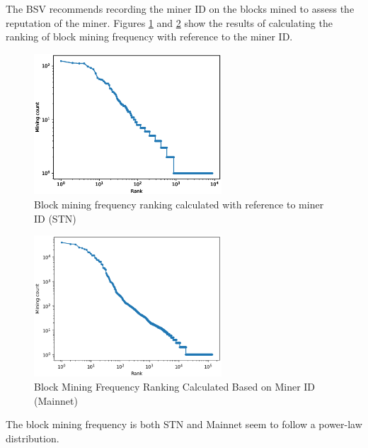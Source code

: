 \documentclass[graybox]{svmult}
\begin{document}
The BSV recommends recording the miner ID on the blocks mined to assess the reputation of the miner.
Figures \ref{fig:minerrank_stn} and \ref{fig:minerrank_mainnet} show the results of calculating the ranking of block mining frequency with reference to the miner ID.
%
\begin{figure}[t]
  \vspace{-35mm}
  \begin{center}
    \includegraphics[width=70mm]{bsv_stn-block_miners-ranking-loglog.eps}
  \end{center}
  \vspace{35mm}
  \caption{Block mining frequency ranking calculated with reference to miner ID (STN)}
  \label{fig:minerrank_stn}
\end{figure}
%
%
\begin{figure}[t]
  \begin{center}
    \includegraphics[width=70mm]{bsv_mainnet-block_miners-ranking-loglog.eps}
  \end{center}
  \caption{Block Mining Frequency Ranking Calculated Based on Miner ID (Mainnet)}
  \label{fig:minerrank_mainnet}
\end{figure}
%
The block mining frequency is both STN and Mainnet seem to follow a power-law distribution.
\end{document}
